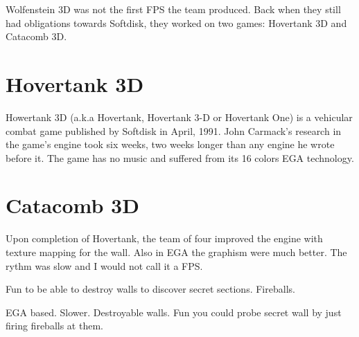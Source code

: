Wolfenstein 3D was not the first FPS the team produced. Back when they still had obligations towards Softdisk, they worked on two games: Hovertank 3D and Catacomb 3D.\\
\par
\section{Hovertank 3D}
Howertank 3D (a.k.a Hovertank, Hovertank 3-D or Hovertank One)  is a vehicular combat game published by Softdisk in April, 1991. John Carmack's research in the game's engine took six weeks, two weeks longer than any engine he wrote before it. The game has no music and suffered from its 16 colors EGA technology.\\
\par
{}
\begin{figure}[H]
\centering
{}
\end{figure}

\begin{figure}[H]
\centering
{}
\end{figure}



\section{Catacomb 3D}
Upon completion of Hovertank, the team of four improved the engine with texture mapping for the wall. Also in EGA the graphism were much better. The rythm was slow and I would not call it a FPS. \\
\par
{}
\begin{figure}[H]
\centering
{}
\end{figure}

Fun to be able to destroy walls to discover secret sections. Fireballs.

\begin{figure}[H]
\centering
{}
\end{figure}

EGA based. Slower. Destroyable walls. Fun you could probe secret wall by just firing fireballs at them.



